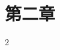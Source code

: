 \documentclass[supercite]{upcthesis}
\begin{document}
\fi

\section{第二章}

2





\ifx\compileAllFiles\undefined
\end{document}
